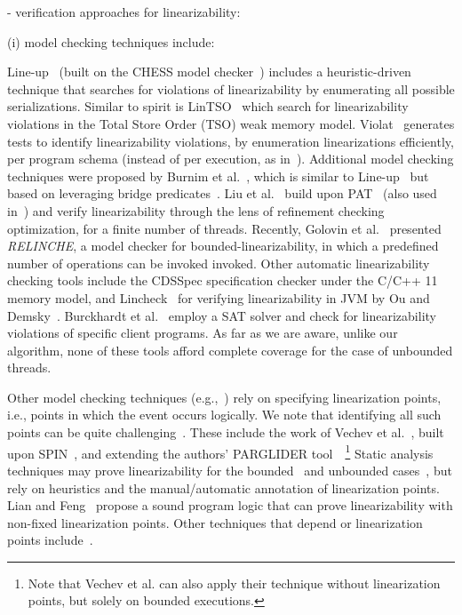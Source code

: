- verification approaches for linearizability:



(i) model checking techniques include:

Line-up~\cite{BuDeMuTa10} (built on the CHESS model checker~\cite{MuQaBaBaNaNe08}) includes a heuristic-driven technique that searches for violations of linearizability by enumerating all possible serializations. Similar to spirit is LinTSO~\cite{BuGoMuYa12} which search for linearizability violations in the Total Store
Order (TSO) weak memory model.
%
Violat~\cite{EmEn19} generates tests to identify linearizability violations, by 
enumeration linearizations efficiently, per program schema (instead of per 
execution, as in~\cite{BuDeMuTa10}).
%
Additional model checking techniques were proposed by Burnim et al.~\cite{BuNeSe11}, which is similar to  Line-up~\cite{BuDeMuTa10} but based on leveraging bridge predicates~\cite{BuSe09}. 
Liu et al.~\cite{LiChLiSuZhDo12} build upon PAT~\cite{SuLuDoPa09} (also used in~\cite{LiChLiSu09,Zh11}) and verify linearizability through the lens of refinement checking optimization, for a finite number of threads.
%
%
Recently, Golovin et al.~\cite{GoKoVa25} presented \textit{RELINCHE}, a model checker for bounded-linearizability, in which a predefined number of operations can be invoked invoked.
%
Other automatic linearizability checking tools include the CDSSpec specification checker under the C/C++ 11 memory model, and Lincheck~\cite{KoDeSoTsAl23} for verifying linearizability in JVM by Ou and Demsky~\cite{OuDe17}. 
%
Burckhardt et al.~\cite{BuAlMa07} employ a SAT solver and check for linearizability violations of specific client programs.
%
As far as we are aware, unlike our algorithm, none of these tools afford complete coverage for the case of unbounded threads.
%

Other model checking techniques (e.g.,~\cite{Fl04}) rely on specifying linearization points, i.e., points in which the event occurs logically. We note that identifying all such points can be quite challenging~\cite{VeYaYo09}.
%
These include the work of Vechev et al.~\cite{VeYaYo09}, built upon SPIN~\cite{Ho97}, and extending the authors' PARGLIDER tool~\cite{VeYa08}~\footnote{Note that Vechev et al. can also apply their technique without linearization points, but solely on bounded executions.}
%
Static analysis techniques may prove linearizability for the 
bounded~\cite{AmRiReSaYa07} and unbounded cases~\cite{BeLeMaRaSa08, Va09, 
Va10}, but rely on heuristics and the manual/automatic annotation of 
linearization points. 
%
Lian and Feng~\cite{LiFe13} propose a sound program logic that can prove 
linearizability with non-fixed linearization points.
%
Other techniques that depend or linearization points 
include~\cite{OhRiVeYaYo10, ZhPeHa15, AbJoTr16}. 
%

